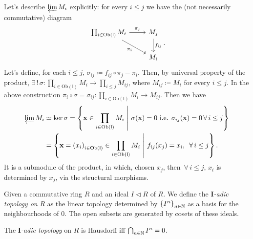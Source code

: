 \begin{ex}
	Let's describe $\varprojlim M_i$ explicitly: for every $i \leq j$ we have the (not necessarily commutative) diagram
	\begin{equation}
	\begin{tikzcd}
		\prod_{i \in \mathrm{Ob} \left(\mathsf{I}\right)} M_i \arrow[r, "\pi_j", rightarrow] \arrow[rd, "\pi_i"', rightarrow] &
		M_j \arrow[d, "f_{ij}", rightarrow] \\
		& M_i
	\end{tikzcd} 
	.\end{equation}
	Let's define, for each $i \leq j$, $\sigma_{ij} \coloneqq f_{ij} \circ\pi_j - \pi_i$.
	Then, by universal property of the product,
	$\exists\, !\, \sigma\colon \prod_{i \in \mathrm{Ob} \left(\mathsf{I}\right)} M_i \to \prod_{i \leq j} M_{ij}$,
	where $M_{ij} \coloneqq M_i$ for every $i \leq j$.
	In the above construction $\pi_i \circ\sigma = \sigma_{ij}\colon \prod_{i \in \mathrm{Ob} \left(\mathsf{I}\right)} M_i \to M_{ij}$.
	Then we have
	\begin{align}
		\varprojlim M_i &\simeq \ker \sigma =
		\left\{ \mathbf{x} \in \prod_{i \in \mathrm{Ob} \left(\mathsf{I}\right)}
			M_i \ \middle|\ \sigma(\mathbf{x}) = 0
		\text{ i.e. } \sigma_{ij}(\mathbf{x}) =0 \,\forall\, i \leq j \right\} \\
				&=
		\left\{ \mathbf{x} = \left( x_i \right)_{i \in \mathrm{Ob} \left(\mathsf{I}\right)} \in
		\prod_{i \in \mathrm{Ob} \left(\mathsf{I}\right)} M_i \ \middle|\ 
		f_{ij}(x_j) = x_i, \ \,\forall\, i \leq j \right\}
	.\end{align} 
	It is a submodule of the product, in which, chosen $x_j$, then $\,\forall\, i \leq j$, $x_i$ is determined by $x_j$, via the structural morphisms.
\end{ex} 

\begin{defn}
	Given a commutative ring $R$ and an ideal $I \triangleleft R$ of $R$.
	We define the {\em $\mathbf{I}$-adic topology on} $R$ as the linear topology determined by
	$\left\{ I^n \right\}_{n \in \mathbb{N}}$ as a basis for the neighbourhoods of $0$.
	The open subsets are generated by cosets of these ideals.
\end{defn}

\begin{rem}
	The {\em $\mathbf{I}$-adic topology} on $R$ is Hausdorff iff $\bigcap_{n \in \mathbb{N}} I^n = 0$.
\end{rem} 

